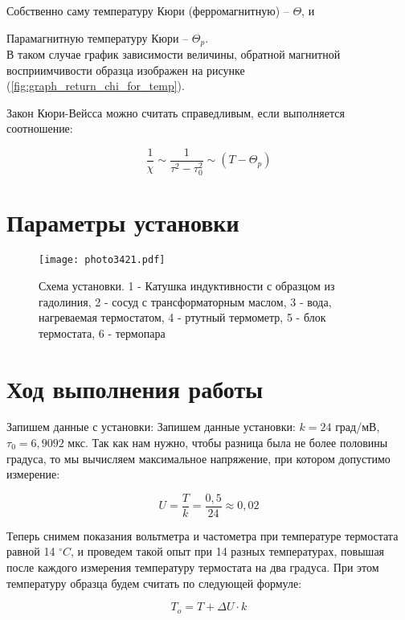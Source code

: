 \documentclass[a4paper,13pt]{article}
\begin{document}
	Собственно саму температуру Кюри (ферромагнитную) -- $\Theta$, и 
	
	Парамагнитную температуру Кюри -- $\Theta_{p}$.\\ В таком случае график зависимости величины, обратной магнитной восприимчивости образца изображен на рисунке (\ref{fig:graph_return_chi_for_temp}).
	
	Закон Кюри-Вейсса можно считать справедливым, если выполняется соотношение: 
	
	\begin{equation}
		\frac{1}{\chi} \sim \frac{1}{\tau^{2} - \tau^{2}_{0}} \sim \left(T - \Theta_{p}\right)
	\end{equation}
	\section{Параметры установки}
	
	\begin{figure}[h!]
		\begin{center}
			\texttt{[image: photo3421.pdf]}
			\label{fig:schem_of_facility}
			\caption{Схема установки. 1 - Катушка индуктивности с образцом из гадолиния, 2 - сосуд с трансформаторным маслом, 3 - вода, нагреваемая термостатом, 4 - ртутный термометр, 5 - блок термостата, 6 - термопара}
		\end{center}
	\end{figure}
	

\section{Ход выполнения работы}
Запишем данные с установки:
Запишем данные установки: $ k= 24 $ град/мВ, $ \tau_0 = 6,9092 $ мкс. Так как нам нужно, чтобы разница была не более половины градуса, то мы вычисляем максимальное напряжение, при котором допустимо измерение:

\begin{equation}
U = \frac{T}{k} = \frac{0,5}{24}  \approx 0,02
\end{equation}

Теперь снимем показания вольтметра и частометра при температуре термостата равной 14 $ ^\circ C $, и проведем такой опыт при 14 разных температурах, повышая после каждого измерения температуру термостата на два градуса. При этом температуру образца будем считать по следующей формуле:

\begin{equation}\label{}
T_o = T + \varDelta U \cdot k
\end{equation}
\end{document}
